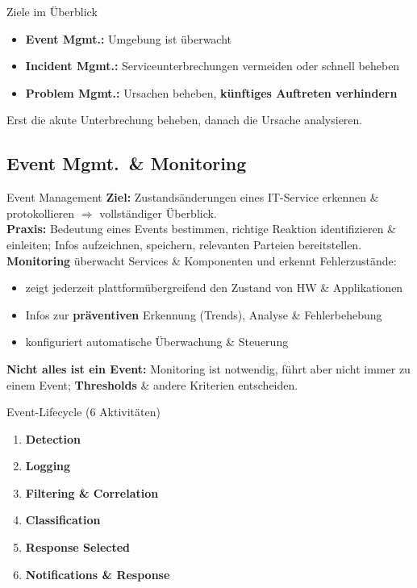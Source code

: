 \documentclass[a4paper, fontsize=7pt]{scrartcl}
\begin{document}
\begin{mainbox}{Ziele im Überblick}
\begin{itemize}
    \item \textbf{Event Mgmt.:} Umgebung ist überwacht
    \item \textbf{Incident Mgmt.:} Serviceunterbrechungen vermeiden oder schnell
          beheben
    \item \textbf{Problem Mgmt.:} Ursachen beheben, \textbf{künftiges Auftreten
          verhindern}
\end{itemize}
Erst die akute Unterbrechung beheben, danach die Ursache analysieren.
\end{mainbox}

\subsection{Event Mgmt.\ \& Monitoring}

\begin{mainbox}{Event Management}
\textbf{Ziel:} Zustandsänderungen eines IT-Service erkennen \& protokollieren
$\Rightarrow$ vollständiger Überblick.\\
\textbf{Praxis:} Bedeutung eines Events bestimmen, richtige Reaktion
identifizieren \& einleiten; Infos aufzeichnen, speichern, relevanten Parteien
bereitstellen.\\
\textbf{Monitoring} überwacht Services \& Komponenten und erkennt Fehlerzustände:
\begin{itemize}
    \item zeigt jederzeit plattformübergreifend den Zustand von HW \& Applikationen
    \item Infos zur \textbf{präventiven} Erkennung (Trends), Analyse \&
          Fehlerbehebung
    \item konfiguriert automatische Überwachung \& Steuerung
\end{itemize}
\textbf{Nicht alles ist ein Event:} Monitoring ist notwendig, führt aber nicht
immer zu einem Event; \textbf{Thresholds} \& andere Kriterien entscheiden.
\end{mainbox}

\begin{mainbox}{Event-Lifecycle (6 Aktivitäten)}
\begin{enumerate}
    \item \textbf{Detection}
    \item \textbf{Logging}
    \item \textbf{Filtering \& Correlation}
    \item \textbf{Classification}
    \item \textbf{Response Selected}
    \item \textbf{Notifications \& Response}
\end{enumerate}
\end{mainbox}
\end{document}
